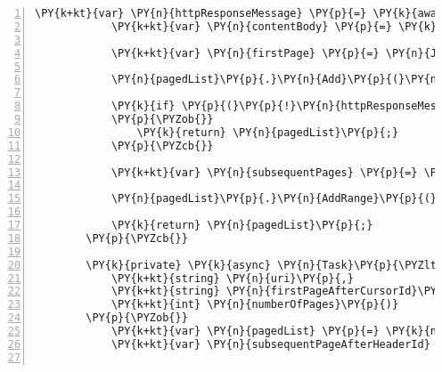 \begin{Verbatim}[commandchars=\\\{\},numbers=left,firstnumber=1,stepnumber=1,numberblanklines=0]
            \PY{k+kt}{var} \PY{n}{httpResponseMessage} \PY{p}{=} \PY{k}{await} \PY{n}{SendHttpRequestMessageAsync}\PY{p}{(}\PY{n}{httpMethod}\PY{p}{,} \PY{n}{uri}\PY{p}{,} \PY{n}{content}\PY{p}{)}\PY{p}{;}
            \PY{k+kt}{var} \PY{n}{contentBody} \PY{p}{=} \PY{k}{await} \PY{n}{httpClient}\PY{p}{.}\PY{n}{ReadAsStringAsync}\PY{p}{(}\PY{n}{httpResponseMessage}\PY{p}{)}\PY{p}{.}\PY{n}{ConfigureAwait}\PY{p}{(}\PY{k}{false}\PY{p}{)}\PY{p}{;}

            \PY{k+kt}{var} \PY{n}{firstPage} \PY{p}{=} \PY{n}{JsonConfig}\PY{p}{.}\PY{n}{DeserializeObject}\PY{p}{\PYZlt{}}\PY{n}{IList}\PY{p}{\PYZlt{}}\PY{n}{T}\PY{p}{\PYZgt{}}\PY{p}{\PYZgt{}}\PY{p}{(}\PY{n}{contentBody}\PY{p}{)}\PY{p}{;}

            \PY{n}{pagedList}\PY{p}{.}\PY{n}{Add}\PY{p}{(}\PY{n}{firstPage}\PY{p}{)}\PY{p}{;}

            \PY{k}{if} \PY{p}{(}\PY{p}{!}\PY{n}{httpResponseMessage}\PY{p}{.}\PY{n}{Headers}\PY{p}{.}\PY{n}{TryGetValues}\PY{p}{(}\PY{l+s}{\PYZdq{}cb\PYZhy{}after\PYZdq{}}\PY{p}{,} \PY{k}{out} \PY{k+kt}{var} \PY{n}{firstPageAfterCursorId}\PY{p}{)}\PY{p}{)}
            \PY{p}{\PYZob{}}
                \PY{k}{return} \PY{n}{pagedList}\PY{p}{;}
            \PY{p}{\PYZcb{}}

            \PY{k+kt}{var} \PY{n}{subsequentPages} \PY{p}{=} \PY{k}{await} \PY{n}{GetAllSubsequentPages}\PY{p}{\PYZlt{}}\PY{n}{T}\PY{p}{\PYZgt{}}\PY{p}{(}\PY{n}{uri}\PY{p}{,} \PY{n}{firstPageAfterCursorId}\PY{p}{.}\PY{n}{First}\PY{p}{(}\PY{p}{)}\PY{p}{,} \PY{n}{numberOfPages}\PY{p}{)}\PY{p}{;}

            \PY{n}{pagedList}\PY{p}{.}\PY{n}{AddRange}\PY{p}{(}\PY{n}{subsequentPages}\PY{p}{)}\PY{p}{;}

            \PY{k}{return} \PY{n}{pagedList}\PY{p}{;}
        \PY{p}{\PYZcb{}}

        \PY{k}{private} \PY{k}{async} \PY{n}{Task}\PY{p}{\PYZlt{}}\PY{n}{IList}\PY{p}{\PYZlt{}}\PY{n}{IList}\PY{p}{\PYZlt{}}\PY{n}{T}\PY{p}{\PYZgt{}}\PY{p}{\PYZgt{}}\PY{p}{\PYZgt{}} \PY{n}{GetAllSubsequentPages}\PY{p}{\PYZlt{}}\PY{n}{T}\PY{p}{\PYZgt{}}\PY{p}{(}
            \PY{k+kt}{string} \PY{n}{uri}\PY{p}{,}
            \PY{k+kt}{string} \PY{n}{firstPageAfterCursorId}\PY{p}{,}
            \PY{k+kt}{int} \PY{n}{numberOfPages}\PY{p}{)}
        \PY{p}{\PYZob{}}
            \PY{k+kt}{var} \PY{n}{pagedList} \PY{p}{=} \PY{k}{new} \PY{n}{List}\PY{p}{\PYZlt{}}\PY{n}{IList}\PY{p}{\PYZlt{}}\PY{n}{T}\PY{p}{\PYZgt{}}\PY{p}{\PYZgt{}}\PY{p}{(}\PY{p}{)}\PY{p}{;}
            \PY{k+kt}{var} \PY{n}{subsequentPageAfterHeaderId} \PY{p}{=} \PY{n}{firstPageAfterCursorId}\PY{p}{;}


\end{Verbatim}
